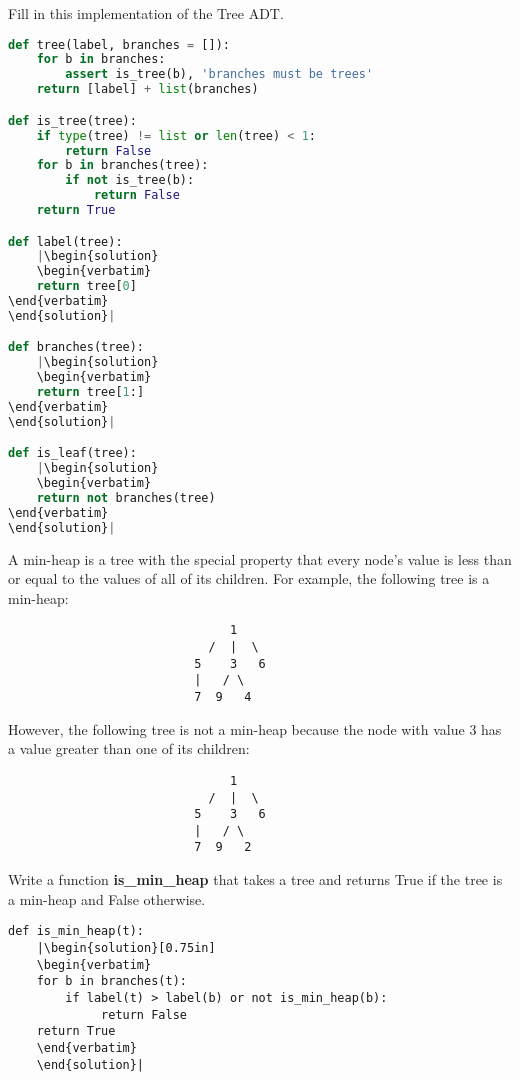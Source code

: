 \question 
Fill in this implementation of the Tree ADT.

\begin{lstlisting}[language=Python]
def tree(label, branches = []):
    for b in branches:
        assert is_tree(b), 'branches must be trees'
    return [label] + list(branches)

def is_tree(tree):
    if type(tree) != list or len(tree) < 1:
        return False
    for b in branches(tree):
        if not is_tree(b):
            return False
    return True

def label(tree):
    |\begin{solution}
    \begin{verbatim}
    return tree[0] 
\end{verbatim}
\end{solution}|

def branches(tree):
    |\begin{solution}
    \begin{verbatim}
    return tree[1:] 
\end{verbatim}
\end{solution}|

def is_leaf(tree):
    |\begin{solution}
    \begin{verbatim}
    return not branches(tree) 
\end{verbatim}
\end{solution}|
\end{lstlisting}

\question
A min-heap is a tree with the special property that every node’s value is less than or equal to the values of all of its children. For example, the following tree is a min-heap:
\begin{verbatim}
                               1
                            /  |  \
                          5    3   6
                          |   / \  
                          7  9   4
\end{verbatim}
However, the following tree is not a min-heap because the node with value 3 has a value greater than one of its children:
\begin{verbatim}
                               1
                            /  |  \
                          5    3   6
                          |   / \  
                          7  9   2
\end{verbatim}
\newpage
Write a function \textbf{is\_min\_heap} that takes a tree and returns True if the tree is a min-heap and False otherwise.
\begin{lstlisting}
def is_min_heap(t):
    |\begin{solution}[0.75in]
    \begin{verbatim}
    for b in branches(t):
        if label(t) > label(b) or not is_min_heap(b):
             return False
    return True    
    \end{verbatim}
    \end{solution}|
\end{lstlisting}

